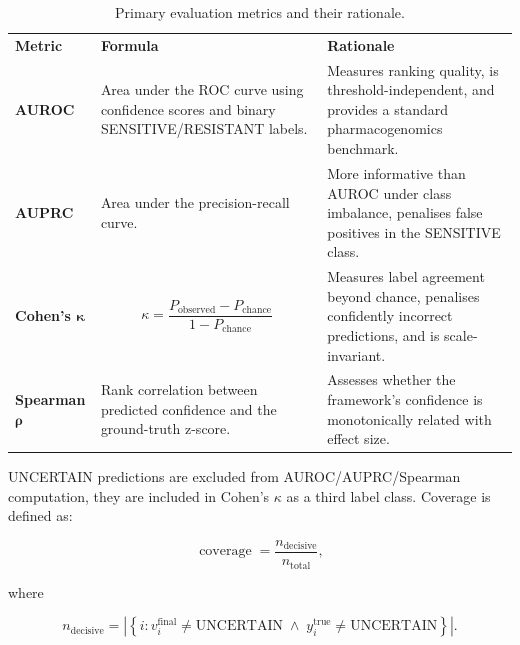 \documentclass{article}
\begin{document}
\begin{table}[ht]
\centering
\caption{Primary evaluation metrics and their rationale.}
\label{tab:evaluation-metrics}
\small
\renewcommand{\arraystretch}{1.5}

\begin{tabulary}{\textwidth}{
    >{\raggedright\arraybackslash}p{0.12\textwidth}
    >{\raggedright\arraybackslash}p{0.38\textwidth}
    L
}
\color{white}\textbf{Metric} &
\color{white}\textbf{Formula} &
\color{white}\textbf{Rationale} \\

\textbf{AUROC} &
Area under the ROC curve using confidence scores and binary
SENSITIVE/RESISTANT labels. &
Measures ranking quality, is threshold-independent, and provides a
standard pharmacogenomics benchmark. \\ \hline

\textbf{AUPRC} &
Area under the precision-recall curve. &
More informative than AUROC under class imbalance, penalises false
positives in the SENSITIVE class. \\ \hline

\textbf{Cohen's $\boldsymbol{\kappa}$} &
\[
\kappa=
\frac{P_{\mathrm{observed}}-P_{\mathrm{chance}}}
     {1-P_{\mathrm{chance}}}
\]
&
Measures label agreement beyond chance, penalises confidently incorrect
predictions, and is scale-invariant. \\ \hline

\textbf{Spearman $\boldsymbol{\rho}$} &
Rank correlation between predicted confidence and the ground-truth
z-score. &
Assesses whether the framework's confidence is monotonically related
with effect size. \\ \hline

\end{tabulary}

\end{table}

UNCERTAIN predictions are excluded from AUROC/AUPRC/Spearman computation, they are included in Cohen's $\kappa$ as a third label class. Coverage is defined as:

\[
\operatorname{coverage}
=
\frac{n_{\mathrm{decisive}}}{n_{\mathrm{total}}},
\]

where

\[
n_{\mathrm{decisive}}
=
\left|
\left\{
i :
v_i^{\mathrm{final}}\neq\mathrm{UNCERTAIN}
\;\land\;
y_i^{\mathrm{true}}\neq\mathrm{UNCERTAIN}
\right\}
\right|.
\]
\end{document}
